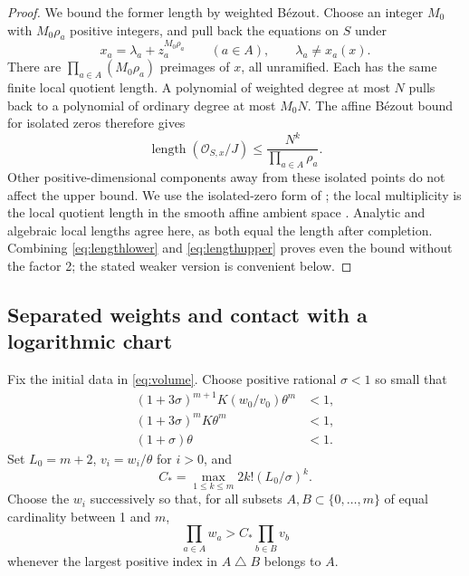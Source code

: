 \documentclass[11pt]{article}
\theoremstyle{definition}
\theoremstyle{remark}
\newcommand{\len}{\operatorname{length}}
\newcommand{\OO}{\mathcal O}
\numberwithin{equation}{section}
\begin{document}
\begin{proof}
We bound the former length by weighted B\'ezout. Choose an integer
\(M_0\) with \(M_0\rho_a\) positive integers, and pull back the
equations on \(S\) under
\[
 x_a=\lambda_a+z_a^{M_0\rho_a}\qquad(a\in A),
 \qquad \lambda_a\ne x_a(x).
\]
There are \(\prod_{a\in A}(M_0\rho_a)\) preimages of \(x\), all
unramified. Each has the same finite local quotient length. A
polynomial of weighted degree at most \(N\) pulls back to a polynomial
of ordinary degree at most \(M_0N\). The affine B\'ezout bound for
isolated zeros therefore gives
\begin{equation}\label{eq:lengthupper}
 \len(\OO_{S,x}/J)\le\frac{N^k}{\prod_{a\in A}\rho_a}.
\end{equation}
Other positive-dimensional components away from these isolated points
do not affect the upper bound. We use the isolated-zero form of
\cite[Corollary VIII.3]{mondal}; the local multiplicity is the local
quotient length in the smooth affine ambient space
\cite[Section IV.4.2]{mondal}. Analytic and algebraic local lengths
agree here, as both equal the length after completion.
Combining \eqref{eq:lengthlower} and \eqref{eq:lengthupper} proves
even the bound without the factor 2; the stated weaker version is
convenient below.
\end{proof}

\subsection{Separated weights and contact with a logarithmic chart}
Fix the initial data in \eqref{eq:volume}. Choose positive rational
\(\sigma<1\) so small that
\begin{equation}\label{eq:sigma}
 \begin{split}
 (1+3\sigma)^{m+1}K(w_0/v_0)\theta^m&<1,\\
 (1+3\sigma)^mK\theta^m&<1,\\
 (1+\sigma)\theta&<1.
 \end{split}
\end{equation}
Set \(L_0=m+2\), \(v_i=w_i/\theta\) for \(i>0\), and
\[
 C_* =\max_{1\le k\le m}2k!(L_0/\sigma)^k.
\]
Choose the \(w_i\) successively so that, for all subsets
\(A,B\subset\{0,\ldots,m\}\) of equal cardinality between 1 and \(m\),
\begin{equation}\label{eq:separation}
 \prod_{a\in A}w_a>C_*\prod_{b\in B}v_b
\end{equation}
whenever the largest positive index in \(A\mathbin\triangle B\)
belongs to \(A\).
\end{document}
